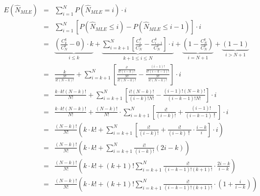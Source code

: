 \documentclass[12pt,letterpaper]{article}
\begin{document}
\begin{scriptsize}
\begin{eqnarray}\label{5beq1}
  E(\hat{N}_{MLE})
   &=& \sum_{i=1}^N{P\left( \hat{N}_{MLE}=i \right) \cdot i}  \\
   &=& \sum_{i=1}^N{\left[ P\left( \hat{N}_{MLE}\leqslant i \right) -P\left( \hat{N}_{MLE}\leqslant i-1 \right) \right] \cdot i}\nonumber \nonumber \\
   &=& \underset{i\leqslant k}{\underbrace{\left( \frac{C_{k}^{k}}{C_{N}^{k}}-0 \right) \cdot k}}+\underset{k+1\leqslant i\leqslant N}{\underbrace{\sum_{i=k+1}^N{\left[ \frac{C_{i}^{k}}{C_{N}^{k}}-\frac{C_{i-1}^{k}}{C_{N}^{k}} \right] \cdot i}}}+\underset{i=N+1}{\underbrace{\left( 1-\frac{C_{N}^{k}}{C_{N}^{k}} \right) }}+\underset{i>N+1}{\underbrace{\left( 1-1 \right) }} \nonumber \\
   &=& \frac{k}{\frac{N!}{k!\left( N-k \right) !}}+\sum_{i=k+1}^N{\left[ \frac{\frac{i!}{k!\left( i-k \right) !}}{\frac{N!}{k!\left( N-k \right) !}}-\frac{\frac{\left( i-1 \right) !}{k!\left( i-k-1 \right) !}}{\frac{N!}{k!\left( N-k \right) !}} \right] \cdot i}\nonumber \\
   &=& \frac{k\cdot k!\left( N-k \right) !}{N!}+\sum_{i=k+1}^N{\left[ \frac{i!\left( N-k \right) !}{\left( i-k \right) !N!}-\frac{\left( i-1 \right) !\left( N-k \right) !}{\left( i-k-1 \right) !N!} \right] \cdot i} \nonumber\\
   &=& \frac{k\cdot k!\left( N-k \right) !}{N!}+\frac{\left( N-k \right) !}{N!}\cdot \sum_{i=k+1}^N{\left[ \frac{i!}{\left( i-k \right) !}+\frac{\left( i-1 \right) !}{\left( i-k-1 \right) \text{！}} \right] \cdot i} \nonumber\\
   &=& \frac{\left( N-k \right) !}{N!}\left( k\cdot k!+\sum_{i=k+1}^N{\left[ \frac{i!}{\left( i-k \right) !}+\frac{i!}{\left( i-k \right) \text{！}}\cdot \frac{i-k}{i} \right] \cdot i} \right)\nonumber\\
   &=& \frac{\left( N-k \right) !}{N!}\left( k\cdot k!+\sum_{i=k+1}^N{\frac{i!}{\left( i-k \right) !}\left( 2i-k \right)} \right)\nonumber\\
   &=& \frac{\left( N-k \right) !}{N!}\left( k\cdot k!+\left( k+1 \right) !\sum_{i=k+1}^N{\frac{i!}{\left( i-k-1 \right) !\left( k+1 \right) !}\cdot \frac{2i-k}{i-k}} \right)\nonumber\\
   &=& \frac{\left( N-k \right) !}{N!}\left( k\cdot k!+\left( k+1 \right) !\sum_{i=k+1}^N{\frac{i!}{\left( i-k-1 \right) !\left( k+1 \right) !}\cdot \left( 1+\frac{i}{i-k} \right)} \right)\nonumber\\

\end{eqnarray}
\end{scriptsize}
\end{document}
